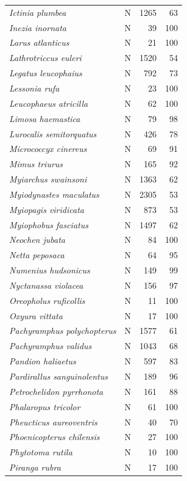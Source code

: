 \documentclass[
  oneside]{scrbook}
\begin{document}
\begin{longtable}[t]{>{}llrr}
\em{Ictinia plumbea} & N & 1265 & 63\\
\addlinespace
\em{Inezia inornata} & N & 39 & 100\\
\em{Larus atlanticus} & N & 21 & 100\\
\em{Lathrotriccus euleri} & N & 1520 & 54\\
\em{Legatus leucophaius} & N & 792 & 73\\
\em{Lessonia rufa} & N & 23 & 100\\
\addlinespace
\em{Leucophaeus atricilla} & N & 62 & 100\\
\em{Limosa haemastica} & N & 79 & 98\\
\em{Lurocalis semitorquatus} & N & 426 & 78\\
\em{Micrococcyx cinereus} & N & 69 & 91\\
\em{Mimus triurus} & N & 165 & 92\\
\addlinespace
\em{Myiarchus swainsoni} & N & 1363 & 62\\
\em{Myiodynastes maculatus} & N & 2305 & 53\\
\em{Myiopagis viridicata} & N & 873 & 53\\
\em{Myiophobus fasciatus} & N & 1497 & 62\\
\em{Neochen jubata} & N & 84 & 100\\
\addlinespace
\em{Netta peposaca} & N & 64 & 95\\
\em{Numenius hudsonicus} & N & 149 & 99\\
\em{Nyctanassa violacea} & N & 156 & 97\\
\em{Oreopholus ruficollis} & N & 11 & 100\\
\em{Oxyura vittata} & N & 17 & 100\\
\addlinespace
\em{Pachyramphus polychopterus} & N & 1577 & 61\\
\em{Pachyramphus validus} & N & 1043 & 68\\
\em{Pandion haliaetus} & N & 597 & 83\\
\em{Pardirallus sanguinolentus} & N & 189 & 96\\
\em{Petrochelidon pyrrhonota} & N & 161 & 88\\
\addlinespace
\em{Phalaropus tricolor} & N & 61 & 100\\
\em{Pheucticus aureoventris} & N & 40 & 70\\
\em{Phoenicopterus chilensis} & N & 27 & 100\\
\em{Phytotoma rutila} & N & 10 & 100\\
\em{Piranga rubra} & N & 17 & 100\\

\end{longtable}
\end{document}
